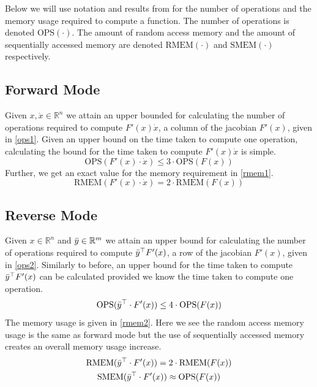 \documentclass{article}
\begin{document}
Below we will use notation and results from \cite{dhamarticle} for the number of operations and the memory usage required to compute a function. The number of operations is denoted $\text{OPS}(\cdot)$. The amount of random access memory and the amount of sequentially accessed memory are denoted $\text{RMEM}(\cdot)$ and $\text{SMEM}(\cdot)$ respectively. 

\subsection{Forward Mode}

Given $x, \Dot{x} \in \mathbb{R}^n$ we attain an upper bounded for calculating the number of operations required to compute $F'(x) \Dot{x}$, a column of the jacobian $F'(x)$, given in \eqref{ops1}. Given an upper bound on the time taken to compute one operation, calculating the bound for the time taken to compute $F'(x)\Dot{x}$ is simple.
\begin{equation} \label{ops1}
    \text{OPS}(F'(x) \cdot \Dot{x}) \leq 3 \cdot \text{OPS}(F(x))
\end{equation}
Further, we get an exact value for the memory requirement in \eqref{rmem1}.
\begin{equation} \label{rmem1}
    \text{RMEM}(F'(x) \cdot \Dot{x}) = 2 \cdot \text{RMEM}(F(x))
\end{equation}

\subsection{Reverse Mode}

Given $x \in \mathbb{R}^n$ and $\Bar{y} \in \mathbb{R}^m$ we attain an upper bound for calculating the number of operations required to compute $\Bar{y}^\top F'(x)$, a row of the jacobian $F'(x)$, given in \eqref{ops2}. Similarly to before, an upper bound for the time taken to compute $\Bar{y}^\top F'(x)$ can be calculated provided we know the time taken to compute one operation.
\begin{equation} \label{ops2}
    \text{OPS}(\Bar{y}^\top \cdot F'(x)) \leq 4 \cdot \text{OPS}(F(x))
\end{equation}
The memory usage is given in \eqref{rmem2}. Here we see the random access memory usage is the same as forward mode but the use of sequentially accessed memory creates an overall memory usage increase.
\begin{equation} \label{rmem2}
    \begin{gathered}
        \text{RMEM}(\Bar{y}^\top \cdot F'(x)) = 2 \cdot \text{RMEM}(F(x)) \\ 
        \text{SMEM}(\Bar{y}^\top \cdot F'(x)) \approx \text{OPS}(F(x))
    \end{gathered}
\end{equation}
\end{document}
